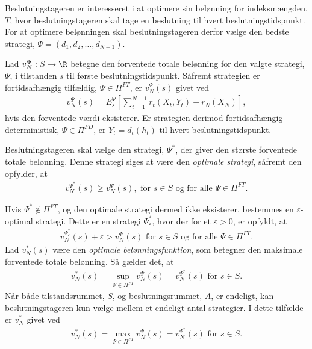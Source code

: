 
 

Beslutningstageren er interesseret i at optimere sin belønning for indeksmængden, $T$, hvor beslutningstageren skal tage en beslutning til hvert beslutningstidspunkt. For at optimere belønningen skal beslutningstageren derfor vælge den bedste strategi, $\Psi=(d_1, d_2,\dots, d_{N-1})$.

Lad $v_N^\Psi: S \to  \R$ betegne den forventede totale belønning for den valgte strategi, $\Psi$, i tilstanden $s$ til første beslutningstidspunkt. Såfremt strategien er fortidsafhængig tilfældig, $\Psi\in \Pi^{FT}$, er $v_N^\Psi(s)$ givet ved
\vspace{-0.3cm}
\begin{align*}
    v_N^{\Psi}(s)=E_{s}^{\Psi}\left[\sum_{t=1}^{N-1}r_t(X_t, Y_t)+r_N(X_N)\right],
\end{align*}
hvis den forventede værdi eksisterer. Er strategien derimod fortidsafhængig deterministisk, $\Psi\in\Pi^{FD}$, er $Y_t = d_t(h_t)$ til hvert beslutningstidspunkt. %

Beslutningstageren skal vælge den strategi, $\Psi^*$, der giver den største forventede totale belønning. Denne strategi siges at være den \textit{optimale strategi}, såfremt den opfylder, at 
\begin{align*}
    v_N^{\Psi^*}(s)\geq v_N^{\Psi}(s), \text{ for } s\in S \text{ og for alle } \Psi\in \Pi^{FT}.
\end{align*}


Hvis $\Psi^* \not\in \Pi^{FT}$, og den optimale strategi dermed ikke eksisterer, bestemmes en $\varepsilon$-optimal strategi. Dette er en strategi $\Psi^*_\varepsilon$, hvor der for et $\varepsilon>0$, er opfyldt, at 
%
\begin{align*}
    v_N^{\Psi^*_\varepsilon}(s)+\varepsilon>v_N^\Psi(s) \text{ for } s\in S \text{ og for alle } \Psi \in \Pi^{FT}.
\end{align*}
%
Lad $v_N^*(s)$ være den \textit{optimale belønningsfunktion}, som betegner den maksimale forventede totale belønning. Så gælder det, at
%
\begin{align}\label{eq:v_N=sup}
    v_N^*(s)=\sup_{\Psi\in \Pi^{FT}} v_N^{\Psi}(s)=v_N^{\Psi^*}(s) \text{ for }  s\in S.
\end{align}
Når både tilstandsrummet, $S$, og beslutningsrummet, $A$, er endeligt, kan beslutningstageren kun vælge mellem et endeligt antal strategier. I dette tilfælde er $v_N^*$ givet ved
\begin{align*}
    v_N^*(s)=\max_{\Psi\in \Pi^{FT}} v_N^{\Psi}(s)=v_N^{\Psi^*}(s) \text{ for }  s\in S.
\end{align*}

